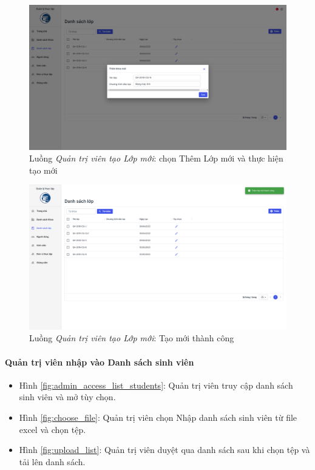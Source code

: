 \documentclass[./../main.tex]{subfiles}
\begin{document}
\begin{figure}[]
	\includegraphics[width=\linewidth]{./images/image60.png}
	\caption{Luồng \emph{Quản trị viên tạo Lớp mới}: chọn Thêm Lớp mới và thực hiện tạo mới}
	\label{fig:admin_add_class}
\end{figure}

\begin{figure}[]
	\includegraphics[width=\linewidth]{./images/image61.png}
	\caption{Luồng \emph{Quản trị viên tạo Lớp mới}: Tạo mới thành công}
	\label{fig:admin_add_class_success}
\end{figure}

\paragraph*{Quản trị viên nhập vào Danh sách sinh viên}

\begin{itemize}
	\item Hình \ref{fig:admin_access_list_students}: Quản trị viên truy cập danh sách sinh viên và mở tùy chọn.
	\item Hình \ref{fig:choose_file}: Quản trị viên chọn Nhập danh sách sinh viên từ file excel và chọn tệp.
	\item Hình \ref{fig:upload_list}: Quản trị viên duyệt qua danh sách sau khi chọn tệp và tải lên danh sách.
\end{itemize}
\end{document}
